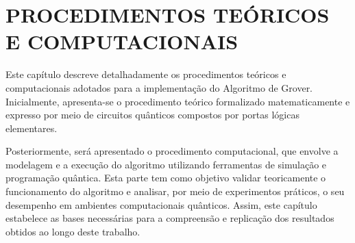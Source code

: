 \chapter{PROCEDIMENTOS TE\'{O}RICOS E COMPUTACIONAIS}
\label{chap:procedimentos}

Este capítulo descreve detalhadamente os procedimentos teóricos e computacionais adotados para a implementação do Algoritmo de Grover. Inicialmente, apresenta-se o procedimento teórico formalizado matematicamente e expresso por meio de circuitos qu\^{a}nticos compostos por portas lógicas elementares.

Posteriormente, será apresentado o procedimento computacional, que envolve a modelagem e a execução do algoritmo utilizando ferramentas de simulação e programação qu\^{a}ntica. Esta parte tem como objetivo validar teoricamente o funcionamento do algoritmo e analisar, por meio de experimentos práticos, o seu desempenho em ambientes computacionais qu\^{a}nticos. Assim, este capítulo estabelece as bases necessárias para a compreensão e replicação dos resultados obtidos ao longo deste trabalho.





